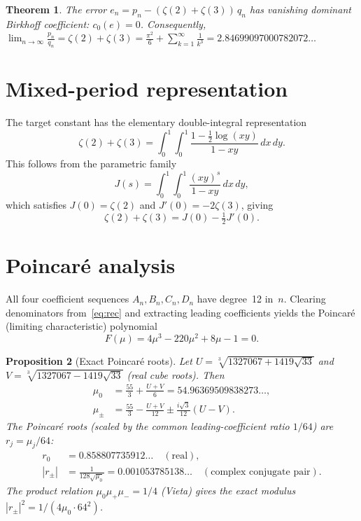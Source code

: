 \documentclass[11pt]{article}
\newtheorem{theorem}{Theorem}
\newtheorem{proposition}[theorem]{Proposition}
\theoremstyle{remark}
\begin{document}
\begin{theorem}\label{thm:main}
The error $e_n = p_n - (\zeta(2)+\zeta(3))\,q_n$ has vanishing
dominant Birkhoff coefficient: $c_0(e) = 0$. Consequently,
$\displaystyle\lim_{n\to\infty} \frac{p_n}{q_n}
= \zeta(2) + \zeta(3)
= \frac{\pi^2}{6} + \sum_{k=1}^{\infty} \frac{1}{k^3}
= 2.84699097000782072\ldots$
\end{theorem}

\section{Mixed-period representation}\label{sec:mixed}

The target constant has the elementary double-integral representation
\begin{equation}\label{eq:mixed}
\zeta(2) + \zeta(3) = \int_0^1\!\int_0^1
\frac{1 - \frac{1}{2}\log(xy)}{1-xy}\,dx\,dy.
\end{equation}
This follows from the parametric family
\begin{equation}\label{eq:Js}
J(s) = \int_0^1\!\int_0^1 \frac{(xy)^s}{1-xy}\,dx\,dy,
\end{equation}
which satisfies $J(0) = \zeta(2)$ and
$J'(0) = -2\zeta(3)$, giving
\begin{equation}\label{eq:key}
\zeta(2) + \zeta(3) = J(0) - \tfrac{1}{2}J'(0).
\end{equation}

\section{Poincar\'e analysis}\label{sec:poincare}

All four coefficient sequences $A_n, B_n, C_n, D_n$ have degree~12
in~$n$. Clearing denominators from~\eqref{eq:rec} and extracting
leading coefficients yields the Poincar\'e (limiting characteristic)
polynomial
\begin{equation}\label{eq:poincare}
F(\mu) = 4\mu^3 - 220\mu^2 + 8\mu - 1 = 0.
\end{equation}

\begin{proposition}[Exact Poincar\'e roots]\label{prop:roots}
Let $U = \sqrt[3]{1327067 + 1419\sqrt{33}}$ and
$V = \sqrt[3]{1327067 - 1419\sqrt{33}}$ (real cube roots). Then
\begin{align}
\mu_0 &= \frac{55}{3} + \frac{U+V}{6}
= 54.96369509838273\ldots, \label{eq:mu0}\\
\mu_\pm &= \frac{55}{3} - \frac{U+V}{12}
\pm \frac{i\sqrt{3}}{12}(U-V). \label{eq:mupm}
\end{align}
The Poincar\'e roots (scaled by the common leading-coefficient
ratio $1/64$) are $r_j = \mu_j/64$:
\begin{align*}
r_0 &= 0.858807735912\ldots \quad (\text{real}), \\
|r_\pm| &= \frac{1}{128\sqrt{\mu_0}}
= 0.001053785138\ldots \quad (\text{complex conjugate pair}).
\end{align*}
The product relation $\mu_0\mu_+\mu_- = 1/4$ (Vieta) gives the
exact modulus $|r_\pm|^2 = 1/(4\mu_0 \cdot 64^2)$.
\end{proposition}
\end{document}
